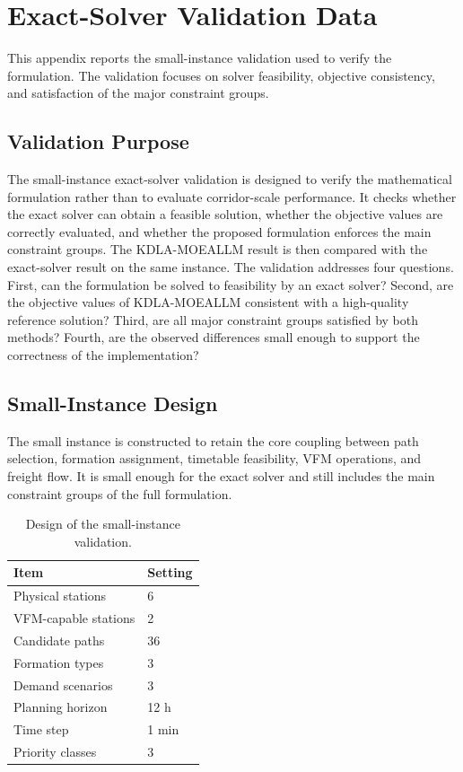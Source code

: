 \documentclass[11pt]{article}
\begin{document}
\section{Exact-Solver Validation Data}
\label{App:ExactSolver}

This appendix reports the small-instance validation used to verify the formulation. The validation focuses on solver feasibility, objective consistency, and satisfaction of the major constraint groups.

\subsection{Validation Purpose}
The small-instance exact-solver validation is designed to verify the mathematical formulation rather than to evaluate corridor-scale performance. It checks whether the exact solver can obtain a feasible solution, whether the objective values are correctly evaluated, and whether the proposed formulation enforces the main constraint groups. The KDLA-MOEALLM result is then compared with the exact-solver result on the same instance. The validation addresses four questions. First, can the formulation be solved to feasibility by an exact solver? Second, are the objective values of KDLA-MOEALLM consistent with a high-quality reference solution? Third, are all major constraint groups satisfied by both methods? Fourth, are the observed differences small enough to support the correctness of the implementation?

\subsection{Small-Instance Design}

The small instance is constructed to retain the core coupling between path selection, formation assignment, timetable feasibility, VFM operations, and freight flow. It is small enough for the exact solver and still includes the main constraint groups of the full formulation.

\begin{table}[!htbp]
	\centering
	\small
	\caption{Design of the small-instance validation.}
\label{AppTab:exactDesign}
	\begin{tabular}{ll}
		\toprule
		\textbf{Item} & \textbf{Setting} \\
		\midrule
		Physical stations & 6 \\
		VFM-capable stations & 2 \\
		Candidate paths & 36 \\
		Formation types & 3 \\
		Demand scenarios & 3 \\
		Planning horizon & 12 h \\
		Time step & 1 min \\
		Priority classes & 3 \\
		\bottomrule
	\end{tabular}
\end{table}
\end{document}
